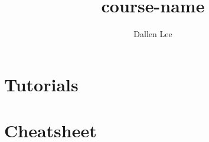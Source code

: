 \documentclass[12pt, a4paper]{article}
\title{\textbf{course-name}} %
\author{Dallen Lee}
\theoremstyle{plain}
\theoremstyle{definition}
\theoremstyle{remark}
\begin{document}

\maketitle
\thispagestyle{empty}
\tableofcontents
\newpage


\section{}


\pagebreak
\section{Tutorials}



\pagebreak
\section{Cheatsheet}
\end{document}
